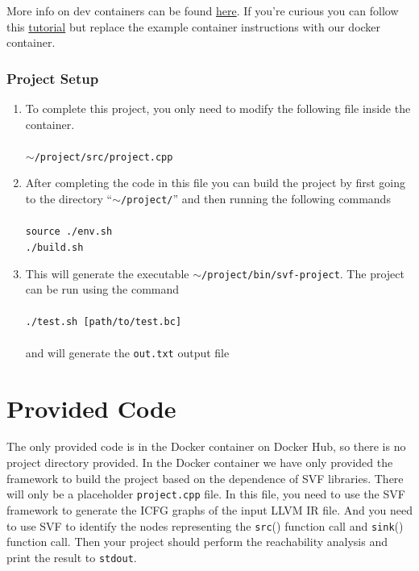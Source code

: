 \documentclass[12pt]{article}
\newcommand{\codeIn}[1]{{\small\tt{#1}}}
\newcommand{\implementationFile}{\codeIn{project.cpp} }
\newcommand{\src}{\codeIn{src}}
\newcommand{\sink}{\codeIn{sink}}
\begin{document}
\begin{enumerate}
    More info on dev containers can be found \href{https://code.visualstudio.com/docs/devcontainers/containers}{here}. If you're curious you can follow this \href{https://code.visualstudio.com/docs/devcontainers/tutorial}{tutorial} but replace the example container instructions with our docker container.
    
\end{enumerate}

\subsubsection{Project Setup}
\begin{enumerate}
    \item To complete this project, you only need to modify the following file inside the container.\\\\
    \codeIn{$\sim$/project/src/project.cpp}\\
    
    \item After completing the code in this file you can build the project by first going to the directory ``\codeIn{$\sim$/project/}'' and then running the following commands\\\\
    \codeIn{source ./env.sh}\\
    \codeIn{./build.sh}\\

    \item This will generate the executable \codeIn{$\sim$/project/bin/svf-project}. The project can be run using the command\\\\    
    \codeIn{./test.sh [path/to/test.bc]}\\\\
    and will generate the \codeIn{out.txt} output file
    

\end{enumerate}
\section{Provided Code}

The only provided code is in the Docker container on Docker Hub, so there is no project directory provided. In the Docker container we have only provided the framework to build the project based on
the dependence of SVF libraries. There will only be a
placeholder \implementationFile file. In this file, you need to use the SVF framework to generate the ICFG graphs of
the input LLVM IR file. And you need to use SVF to identify the nodes
representing the \src () function call and \sink () function call.
Then your project should perform the reachability analysis and print the result to \codeIn{stdout}.
\end{document}
